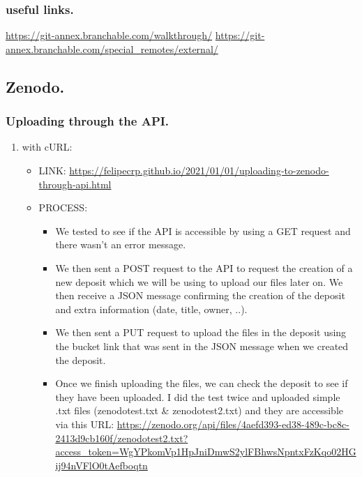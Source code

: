 \documentclass[11pt]{article}
\begin{document}
\subsubsection{useful links.}
\label{sec:orgedfc3d9}
\url{https://git-annex.branchable.com/walkthrough/}
\url{https://git-annex.branchable.com/special\_remotes/external/}


\subsection{Zenodo.}
\label{sec:orgb67670f}
\subsubsection{Uploading through the API.}
\label{sec:org4c83b54}
\begin{enumerate}
\item with cURL:
\label{sec:orgf7469a1}
\begin{itemize}
\item LINK: \url{https://felipecrp.github.io/2021/01/01/uploading-to-zenodo-through-api.html}
\item PROCESS:
\begin{itemize}
\item We tested to see if the API is accessible by using a GET
request and there wasn't an error message.
\item We then sent a POST request to the API to request the creation
of a new deposit which we will be using to upload our files
later on. We then receive a JSON message confirming the
creation of the deposit and extra information (date, title, owner, ..).
\item We then sent a PUT request to upload the files in the deposit
using the bucket link that was sent in the JSON message when
we created the deposit.
\item Once we finish uploading the files, we can check the deposit
to see if they have been uploaded. I did the test twice and
uploaded simple .txt files (zenodotest.txt \& zenodotest2.txt)
and they are accessible via this URL: \url{https://zenodo.org/api/files/4aefd393-ed38-489c-bc8c-2413d9cb160f/zenodotest2.txt?access\_token=WgYPkomVp1HpJniDmwS2ylFBhwsNpntxFzKqo02HGij94nVFlO0tAefboqtn}
\end{itemize}
\end{itemize}


\end{enumerate}
\end{document}
